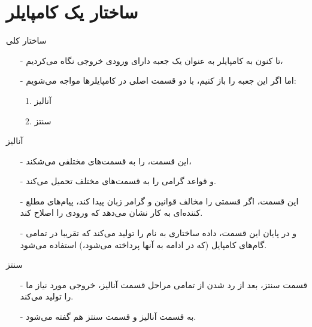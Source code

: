 \section{ساختار یک کامپایلر}
\begin{frame}{ساختار کلی}
\begin{itemize}\itemr
\item[-]
تا کنون به کامپایلر به عنوان یک جعبه دارای ورودی خروجی نگاه می‌کردیم،
\item[-]
اما اگر این جعبه را باز کنیم، با دو قسمت اصلی در کامپایلر‌ها مواجه می‌شویم:
\begin{enumerate}\itemr
\item 
آنالیز
\item 
سنتز
\end{enumerate}
\end{itemize}
\end{frame}

\begin{frame}{آنالیز}
\begin{itemize}\itemr
\item[-]
این قسمت،  را به قسمت‌های مختلفی می‌شکند،

\item[-]
و قواعد گرامی را به قسمت‌های مختلف تحمیل می‌کند.

\item[-]
این قسمت، اگر قسمتی را مخالف قوانین و گرامر زبان پیدا کند، پیام‌های مطلع کننده‌ای به کار نشان می‌دهد که ورودی را اصلاح کند.

\item[-]
و در پایان این قسمت، داده ساختاری به نام  را تولید می‌کند که تقریبا در تمامی گام‌های کامپایل (که در ادامه به آنها پرداخته می‌شود،) استفاده می‌شود.
\end{itemize}
\end{frame}

\begin{frame}{سنتز}
\begin{itemize}\itemr
\item[-]
قسمت سنتز، بعد از رد شدن از تمامی مراحل قسمت آنالیز، خروجی مورد نیاز ما را تولید می‌کند.

\item[-]
به قسمت آنالیز 
و قسمت سنتز
هم گفته می‌شود.
\end{itemize}
\end{frame}
